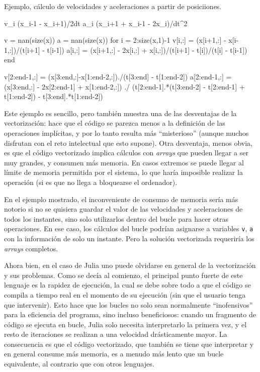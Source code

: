 ﻿\documentclass{article}
\begin{document}
{{Ejemplo, cálculo de velocidades y aceleraciones a partir de posiciiones.

v_i \approx (x_{i-1} - x_{i+1})/2dt
a_i \approx (x_i+1 + x_i-1 - 2x_i)/dt^2


v = nan(size(x))
a = nan(size(x))
for i = 2:size(x,1)-1
  v[i,:] = (x[i+1,:] - x[i-1,:])/(t[i+1] - t[i-1])
  a[i,:] = (x[i+1,:] - 2x[i,:] + x[i,:])/(t[i+1] - t[i])/(t[i] - t[i-1])
end

v[2:end-1,:] = (x[3:end,:]-x[1:end-2,:])./(t[3:end] - t[1:end-2])
a[2:end-1,:] = (x[3:end,:] - 2x[2:end-1] + x[1:end-2,:]) ./
  (t[2:end-1].*(t[3:end-2] - t[2:end-1] + t[1:end-2]) - t[3:end].*t[1:end-2])

Este ejemplo es sencillo, pero también muestra una de las desventajas de
la vectorización: hace que el código se parezca menos a la definición
de las operaciones implícitas, y por lo tanto resulta más ``misterioso''
(aunque muchos disfrutan con el reto intelectual que esto supone).
Otra desventaja, menos obvia, es que el código vectorizado implica
cálculos con \emph{arrays} que pueden llegar a ser muy grandes, y
consumen más memoria. En casos extremos se puede llegar al límite
de memoria permitida por el sistema, lo que haría imposible
realizar la operación (si es que no llega a bloquearse el ordenador).

En el ejemplo mostrado, el inconveniente de consumo de memoria sería
más notorio si no se quisiera guardar el valor de las velocidades y
aceleraciones de todos los instantes, sino solo utilizarlos dentro
del bucle para hacer otras operaciones. En ese caso, los cálculos del bucle
podrían asignarse a variables \texttt{v}, \texttt{a} con la información de solo
un instante. Pero la solución vectorizada requeriría los \emph{arrays}
completos.

Ahora bien, en el caso de Julia uno puede olvidarse en general
de la vectorización y sus problemas. Como se decía al comienzo, el principal punto
fuerte de este lenguaje es la rapidez de ejecución, la cual se debe
sobre todo a que el código se compila a tiempo real en el momento de
su ejecución (sin que el usuario tenga que intervenir). Esto hace
que los bucles no solo sean normalmente ``inofensivos'' para la
eficiencia del programa, sino incluso beneficiosos: cuando un
fragmento de código se ejecuta en bucle, Julia solo necesita
interpretarlo la primera vez, y el resto de iteraciones se realizan
a una velocidad drásticamente mayor. La consecuencia es que
el código vectorizado, que también se tiene que interpretar y
en general consume más memoria, es a menudo más lento que un bucle
equivalente, al contrario que con otros lenguajes.


}}
\end{document}
